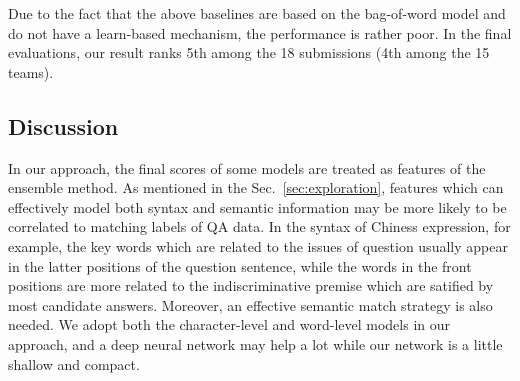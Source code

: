 \documentclass{llncs}
\begin{document}
Due to the fact that the above baselines are based on the bag-of-word model and do not have a learn-based mechanism, the performance is rather poor. In the final evaluations, our result ranks 5th among the 18 submissions (4th among the 15 teams).

\subsection{Discussion}
\label{discussion}

In our approach, the final scores of some models are treated as features of the ensemble method. As mentioned in the Sec.~\ref{sec:exploration}, features which can effectively model both syntax and semantic information may be more likely to be correlated to matching labels of QA data. In the syntax of Chiness expression, for example, the key words which are related to the issues of question usually appear in the latter positions of the question sentence, while the words in the front positions are more related to the indiscriminative premise which are satified by most candidate answers. Moreover, an effective semantic match strategy is also needed. We adopt both the character-level and word-level models in our approach, and a deep neural network may help a lot while our network is a little shallow and compact.
\end{document}
